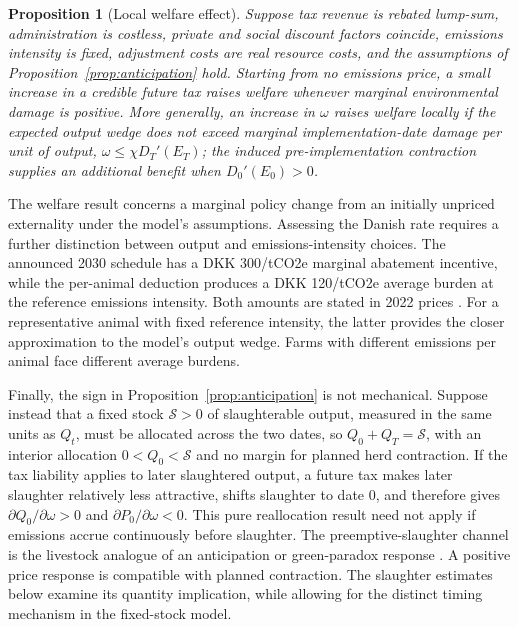 \documentclass[11pt]{article}
\newtheorem{proposition}{Proposition}
\begin{document}
\begin{proposition}[Local welfare effect]\label{prop:welfare}
Suppose tax revenue is rebated lump-sum, administration is costless, private and social discount factors coincide, emissions intensity is fixed, adjustment costs are real resource costs, and the assumptions of Proposition~\ref{prop:anticipation} hold. Starting from no emissions price, a small increase in a credible future tax raises welfare whenever marginal environmental damage is positive. More generally, an increase in $\omega$ raises welfare locally if the expected output wedge does not exceed marginal implementation-date damage per unit of output, $\omega\leq\chi D_T'(E_T)$; the induced pre-implementation contraction supplies an additional benefit when $D_0'(E_0)>0$.
\end{proposition}

The welfare result concerns a marginal policy change from an initially unpriced externality under the model's assumptions. Assessing the Danish rate requires a further distinction between output and emissions-intensity choices. The announced 2030 schedule has a DKK 300/tCO2e marginal abatement incentive, while the per-animal deduction produces a DKK 120/tCO2e average burden at the reference emissions intensity. Both amounts are stated in 2022 prices \citep{danishgovernment2024,danishtaxministry2024}. For a representative animal with fixed reference intensity, the latter provides the closer approximation to the model's output wedge. Farms with different emissions per animal face different average burdens.

Finally, the sign in Proposition~\ref{prop:anticipation} is not mechanical. Suppose instead that a fixed stock $\mathcal S>0$ of slaughterable output, measured in the same units as $Q_t$, must be allocated across the two dates, so $Q_0+Q_T=\mathcal S$, with an interior allocation $0<Q_0<\mathcal S$ and no margin for planned herd contraction. If the tax liability applies to later slaughtered output, a future tax makes later slaughter relatively less attractive, shifts slaughter to date 0, and therefore gives $\partial Q_0/\partial\omega>0$ and $\partial P_0/\partial\omega<0$. This pure reallocation result need not apply if emissions accrue continuously before slaughter. The preemptive-slaughter channel is the livestock analogue of an anticipation or green-paradox response \citep{smulders2012}. A positive price response is compatible with planned contraction. The slaughter estimates below examine its quantity implication, while allowing for the distinct timing mechanism in the fixed-stock model.
\end{document}
